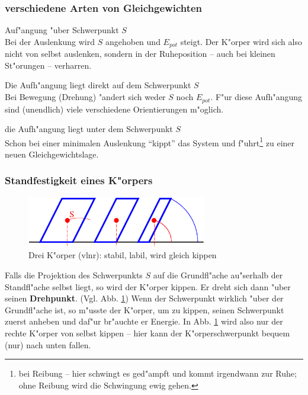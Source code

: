 \subsubsection{verschiedene Arten von Gleichgewichten}
\begin{description}[\setlabelstyle{\bfseries\slshape}]
\item[Stabiles] Auf"angung "uber Schwerpunkt $S$\\Bei der Auslenkung wird
   $S$ angehoben und $E_{pot}$  steigt. Der K"orper wird sich also
   nicht von selbst auslenken, sondern in der Ruheposition -- auch bei
   kleinen St"orungen -- verharren.
\item[indifferentes] Die Aufh"angung liegt direkt auf dem Schwerpunkt
   $S$\\Bei Bewegung (Drehung) "andert sich weder $S$ noch
   $E_{pot}$. F"ur diese Aufh"angung sind (unendlich) viele verschiedene
   Orientierungen m"oglich.
\item[labil] die Aufh"angung liegt unter dem Schwerpunkt $S$\\Schon bei
   einer minimalen Auslenkung "`kippt"' das System und
   f"uhrt\footnote{bei Reibung -- hier schwingt es ged"ampft und kommt
     irgendwann zur Ruhe; ohne Reibung wird die Schwingung ewig gehen.} zu einer neuen Gleichgewichtslage.
\end{description}


\subsubsection{Standfestigkeit eines K"orpers}
\label{kap_standfestigkeit-korpers}

\begin{figure}
   \centering
\includegraphics[width=0.7\textwidth]{bilder/schwerpunkt}
   \caption[Vergleich: Stabil, instabil]{Drei K"orper (vlnr): stabil,
     labil, wird gleich kippen}
   \label{abb_standfestigkeit}
\end{figure}

Falls die Projektion des Schwerpunkts $S$ auf die Grundfl"ache
au"serhalb der Standfl"ache selbst liegt, so wird der K"orper kippen.
Er dreht sich dann "uber seinen
\textbf{Drehpunkt}. (Vgl. Abb. \ref{abb_standfestigkeit}) Wenn der
Schwerpunkt wirklich "uber der Grundfl"ache ist, so m"usste der K"orper,
um zu kippen, seinen Schwerpunkt zuerst anheben und daf"ur br"auchte er
Energie. In Abb. \ref{abb_standfestigkeit} wird also nur der rechte
K"orper von selbst kippen -- hier kann der K"orperschwerpunkt bequem
(nur) nach unten fallen.




